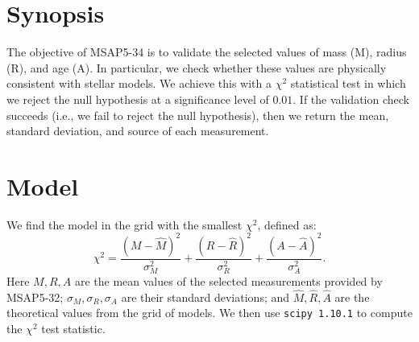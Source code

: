 \documentclass[a4paper, oneside, 11pt, article, english]{memoir}
\begin{document}



\section{Synopsis}
\label{sec:synopsis}

The objective of MSAP5-34 is to validate the selected values of mass (M), radius (R), and age (A). 
In particular, we check whether these values are physically consistent with stellar models. 
We achieve this with a $\chi^2$ statistical test in which we reject the null hypothesis at a significance level of $0.01$. 
If the validation check succeeds (i.e., we fail to reject the null hypothesis), then we return the mean, standard deviation, and source of each measurement. 





\section{Model}
\label{sec:model}

We find the model in the grid with the smallest $\chi^2$, defined as:
\begin{equation}
    \chi^2 
    = 
    \frac{(M - \hat{M})^2}{\sigma_M^2}
    +
    \frac{(R - \hat{R})^2}{\sigma_R^2}
    +
    \frac{(A - \hat{A})^2}{\sigma_A^2}.
\end{equation}
Here $M, R, A$ are the mean values of the selected measurements provided by MSAP5-32; $\sigma_M, \sigma_R, \sigma_A$ are their standard deviations; and $\hat{M}, \hat{R}, \hat{A}$ are the theoretical values from the grid of models. 
We then use \texttt{scipy 1.10.1} to compute the $\chi^2$ test statistic. 



\end{document}
